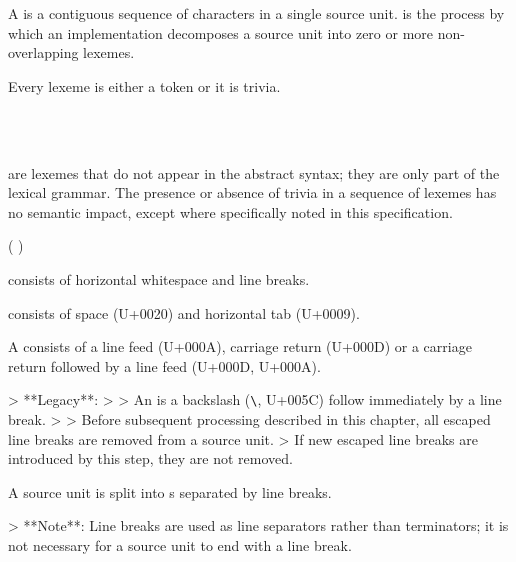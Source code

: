 A  is a contiguous sequence of characters in a single source unit.
 is the process by which an implementation decomposes a source unit into zero or more non-overlapping lexemes.

Every lexeme is either a token or it is trivia.


\begin{Lexical}
     \\
         \\
    \SynOr {}
\end{Lexical}

 are lexemes that do not appear in the abstract syntax; they are only part of the lexical grammar.
The presence or absence of trivia in a sequence of lexemes has no semantic impact, except where specifically noted in this specification.


\begin{Lexical}
    \SynOr {}

        (  \SynOr {} )\SynStar
\end{Lexical}

 consists of horizontal whitespace and line breaks.

 consists of space (U+0020) and horizontal tab (U+0009).


A  consists of a line feed (U+000A), carriage return (U+000D) or a carriage return followed by a line feed (U+000D, U+000A).

> **Legacy**:
>
> An  is a backslash (\lstinline{\}, U+005C) follow immediately by a line break.
>
> Before subsequent processing described in this chapter, all escaped line breaks are removed from a source unit.
> If new escaped line breaks are introduced by this step, they are not removed.

A source unit is split into s separated by line breaks.

> **Note**: Line breaks are used as line separators rather than terminators; it is not necessary for a source unit to end with a line break.

